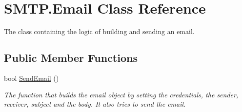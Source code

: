 \hypertarget{class_s_m_t_p_1_1_email}{}\section{S\+M\+T\+P.\+Email Class Reference}
\label{class_s_m_t_p_1_1_email}


The class containing the logic of building and sending an email.  


\subsection*{Public Member Functions}
\begin{DoxyCompactItemize}
\item 
bool \hyperlink{class_s_m_t_p_1_1_email_a8a4cd09a91979f79166cfb556f7f854a}{Send\+Email} ()
\begin{DoxyCompactList}\small\item\em The function that builds the email object by setting the credentials, the sender, receiver, subject and the body. It also tries to send the email. \end{DoxyCompactList}\end{DoxyCompactItemize}
